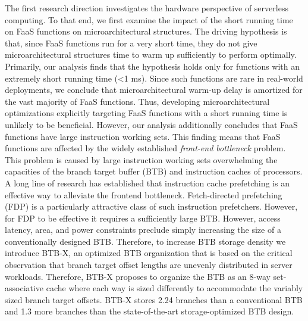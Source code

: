 \documentclass[../main.tex]{subfiles}
\begin{document}
The first research direction investigates the hardware perspective of
serverless computing. To that end, we first examine the impact of the
short running time on FaaS functions on microarchitectural
structures. The driving hypothesis is that, since FaaS functions run
for a very short time, they do not give microarchitectural structures
time to warm up sufficiently to perform optimally. Primarily, our
analysis finds that the hypothesis holds only for functions with an
extremely short running time (<1 ms). Since such functions are rare in
real-world deployments, we conclude that microarchitectural warm-up
delay is amortized for the vast majority of FaaS functions. Thus,
developing microarchitectural optimizations explicitly targeting FaaS
functions with a short running time is unlikely to be
beneficial. However, our analysis additionally concludes that
FaaS functions have large instruction working sets. This finding
means that FaaS functions are affected by the widely established
\emph{front-end bottleneck} problem. This problem is caused by large
instruction working sets overwhelming the capacities of the branch
target buffer (BTB) and instruction caches of processors. A long line
of research has established that instruction cache prefetching is an
effective way to alleviate the frontend bottleneck. Fetch-directed
prefetching (FDP) is a particularly attractive class of such
instruction prefetchers. However, for FDP to be effective it requires
a sufficiently large BTB. However, access latency, area, and power
constraints preclude simply increasing the size of a conventionally
designed BTB. Therefore, to increase BTB storage density we introduce
BTB-X, an optimized BTB organization that is based on the critical
observation that branch target offset lengths are unevenly distributed
in server workloads. Therefore, BTB-X proposes to organize the BTB as
an 8-way set-associative cache where each way is sized differently to
accommodate the variably sized branch target offsets. BTB-X stores
2.24\texttimes{} branches than a conventional BTB and 1.3\texttimes{}
more branches than the state-of-the-art storage-optimized BTB design.
\end{document}
